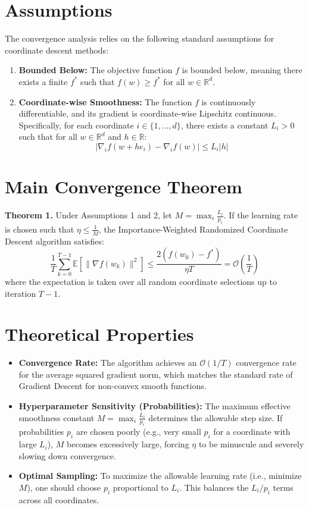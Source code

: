 \documentclass{article}
\begin{document}
\section*{Assumptions}
The convergence analysis relies on the following standard assumptions for coordinate descent methods:
\begin{enumerate}
    \item \textbf{Bounded Below:} The objective function $f$ is bounded below, meaning there exists a finite $f^*$ such that $f(w) \geq f^*$ for all $w \in \mathbb{R}^d$.
    \item \textbf{Coordinate-wise Smoothness:} The function $f$ is continuously differentiable, and its gradient is coordinate-wise Lipschitz continuous. Specifically, for each coordinate $i \in \{1, \dots, d\}$, there exists a constant $L_i > 0$ such that for all $w \in \mathbb{R}^d$ and $h \in \mathbb{R}$:
    \begin{equation}
        |\nabla_i f(w + h e_i) - \nabla_i f(w)| \leq L_i |h|
    \end{equation}
\end{enumerate}

\section*{Main Convergence Theorem}
\textbf{Theorem 1.} Under Assumptions 1 and 2, let $M = \max_{i} \frac{L_i}{p_i}$. If the learning rate is chosen such that $\eta \leq \frac{1}{M}$, the Importance-Weighted Randomized Coordinate Descent algorithm satisfies:
\begin{equation}
    \frac{1}{T} \sum_{k=0}^{T-1} \mathbb{E}[\|\nabla f(w_k)\|^2] \leq \frac{2 (f(w_0) - f^*)}{\eta T} = \mathcal{O}\left(\frac{1}{T}\right)
\end{equation}
where the expectation is taken over all random coordinate selections up to iteration $T-1$.

\section*{Theoretical Properties}
\begin{itemize}
    \item \textbf{Convergence Rate:} The algorithm achieves an $\mathcal{O}(1/T)$ convergence rate for the average squared gradient norm, which matches the standard rate of Gradient Descent for non-convex smooth functions.
    \item \textbf{Hyperparameter Sensitivity (Probabilities):} The maximum effective smoothness constant $M = \max_i \frac{L_i}{p_i}$ determines the allowable step size. If probabilities $p_i$ are chosen poorly (e.g., very small $p_i$ for a coordinate with large $L_i$), $M$ becomes excessively large, forcing $\eta$ to be minuscule and severely slowing down convergence.
    \item \textbf{Optimal Sampling:} To maximize the allowable learning rate (i.e., minimize $M$), one should choose $p_i$ proportional to $L_i$. This balances the $L_i/p_i$ terms across all coordinates.
\end{itemize}
\end{document}

